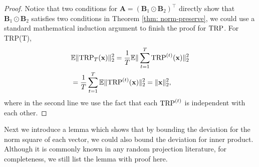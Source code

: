\begin{proof}
Notice that two conditions for $\mathbf{A}  =  (\mathbf{B}_1 \odot\mathbf{B}_2 )^\top$ directly show that $\mathbf{B}_1 \odot\mathbf{B}_2$ satisfies two conditions in Theorem \ref{thm: norm-preserve}, we could use a standard mathematical induction argument to finish the proof for $\textup{TRP}$. For TRP(T), 
\begin{equation}
\begin{aligned}
&\mathbb{E}\|\textup{TRP}_T(\mathbf{x})\|^2_2=\frac{1}{T} \mathbb{E}\|\sum_{t=1}^T \textup{TRP}^{(t)}(\mathbf{x})\|^2_2\\
&= \frac{1}{T}\sum_{t=1}^T\mathbb{E} \|\textup{TRP}^{(t)}(\mathbf{x})\|^2_2= \|\mathbf{x}\|^2_2,
\nonumber 
\end{aligned}
\end{equation}
where in the second line we use the fact that each $\textup{TRP}^{(t)}$ is independent with each other.
\end{proof}


Next we introduce a lemma which shows that by bounding the deviation for the norm square of each vector, we could also bound the deviation for inner product. Although it is commonly known in any random projection literature, for completeness, we still list the lemma with proof here. 




